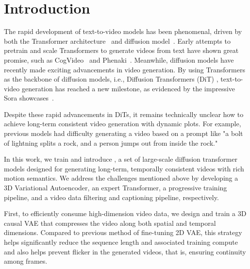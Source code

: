 \section{Introduction}

The rapid development of text-to-video models has been phenomenal, driven by both the Transformer architecture~\citep{vaswani2017attention} and diffusion model~\citep{ho2020denoising}. 
Early attempts to pretrain and scale Transformers to generate videos from text have shown great promise, such as CogVideo~\citep{hong2022cogvideo} and Phenaki~\citep{villegas2022phenaki}. 
Meanwhile, diffusion models have recently made exciting advancements in video generation\citep{singer2022make, ho2022imagen}. 
By using Transformers as the backbone of diffusion models, i.e., Diffusion Transformers (DiT) \citep{peebles2023scalable}, text-to-video generation has reached a new milestone, as evidenced by the impressive Sora showcases~\citep{sora}.  


Despite these rapid advancements in DiTs, it remains technically unclear how to achieve long-term consistent video generation with dynamic plots. For example, previous models had difficulty generating a video based on a prompt like "a bolt of lightning splits a rock, and a person jumps out from inside the rock."


In this work, we train and introduce \model, a set of large-scale diffusion transformer models designed for generating long-term, temporally consistent videos with rich motion semantics. 
We address the challenges mentioned above by developing a 3D Variational Autoencoder, an expert Transformer, a progressive training pipeline, and a video data filtering and captioning pipeline, respectively. 

First, to efficiently consume high-dimension video data, we design and train a 3D causal VAE that compresses the video along both spatial and temporal dimensions. 
Compared to previous method\citep{blattmann2023stable} of fine-tuning 2D VAE, this strategy helps significantly reduce the sequence length and associated training compute and also helps prevent flicker in the generated videos, that is, ensuring continuity among frames.


